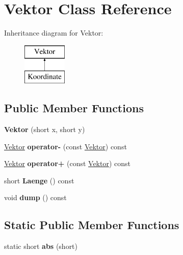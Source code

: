 \hypertarget{class_vektor}{\section{Vektor Class Reference}
\label{class_vektor}
}
Inheritance diagram for Vektor\-:\begin{figure}[H]
\begin{center}
\leavevmode
\includegraphics[height=2.000000cm]{class_vektor}
\end{center}
\end{figure}
\subsection*{Public Member Functions}
\begin{DoxyCompactItemize}
\item 
\hypertarget{class_vektor_a8add163a03b39b55135c2ec9262198a9}{{\bfseries Vektor} (short x, short y)}\label{class_vektor_a8add163a03b39b55135c2ec9262198a9}

\item 
\hypertarget{class_vektor_a514e0b5d6edcbe099788d69d0aad3101}{\hyperlink{class_vektor}{Vektor} {\bfseries operator-\/} (const \hyperlink{class_vektor}{Vektor}) const }\label{class_vektor_a514e0b5d6edcbe099788d69d0aad3101}

\item 
\hypertarget{class_vektor_ad9fbc305dc01fdccdad477fca76ef0e6}{\hyperlink{class_vektor}{Vektor} {\bfseries operator+} (const \hyperlink{class_vektor}{Vektor}) const }\label{class_vektor_ad9fbc305dc01fdccdad477fca76ef0e6}

\item 
\hypertarget{class_vektor_a6f3b7f59bc47dc6ff7e577c80b069e5e}{short {\bfseries Laenge} () const }\label{class_vektor_a6f3b7f59bc47dc6ff7e577c80b069e5e}

\item 
\hypertarget{class_vektor_a34dbf38294542e61d36a8f1b619e8a4b}{void {\bfseries dump} () const }\label{class_vektor_a34dbf38294542e61d36a8f1b619e8a4b}

\end{DoxyCompactItemize}
\subsection*{Static Public Member Functions}
\begin{DoxyCompactItemize}
\item 
\hypertarget{class_vektor_ac97e28f1ae072aa8ddb29f48a0dbb47a}{static short {\bfseries abs} (short)}\label{class_vektor_ac97e28f1ae072aa8ddb29f48a0dbb47a}

\end{DoxyCompactItemize}
